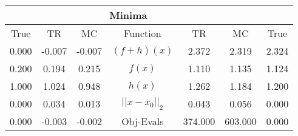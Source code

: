 \begin{tabular}{| c |c |c || c |c |c |c |}
    \hline
    \rowcolor[gray]{0.9}
\multicolumn{3}{|c|}{Parameters} & \multicolumn{4}{|c|}{Minima}\\ \hline True & TR & MC  & Function & TR & MC & True \\
    \hline
  \rowcolor[gray]{0.7}
  0.000 & -0.007 & -0.007   & $ (f + h)(x) $ & 2.372 & 2.319 & 2.324 \\
  \rowcolor[gray]{0.8}
  0.200 & 0.194 & 0.215   & $ f(x) $ & 1.110 & 1.135 & 1.124 \\
  \rowcolor[gray]{0.7}
  1.000 & 1.024 & 0.948   & $ h(x) $ & 1.262 & 1.184 & 1.200 \\
  \rowcolor[gray]{0.8}
  0.000 & 0.034 & 0.013   & $ ||x - x_0||_2 $ & 0.043 & 0.056 & 0.000 \\
  \rowcolor[gray]{0.7}
  0.000 & -0.003 & -0.002   & Obj-Evals & 374.000 & 603.000 & 0.000 \\
\end{tabular}
